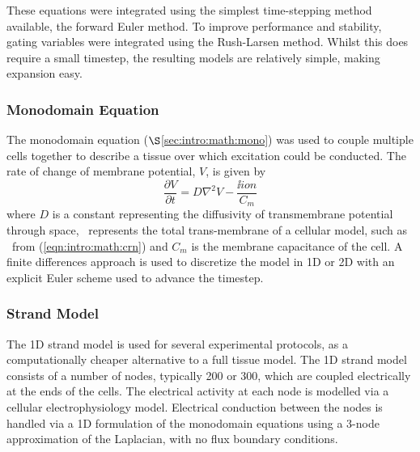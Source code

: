 These equations were integrated using the simplest time-stepping method
available, the forward Euler method.
To improve performance and stability, gating variables were integrated using the
Rush-Larsen method.
Whilst this does require a small timestep, the resulting models are relatively
simple, making expansion easy.


\subsubsection{Monodomain Equation}

The monodomain equation ($\S$\ref{sec:intro:math:mono}) was used to couple multiple cells together to describe
a tissue over which excitation could be conducted.
The rate of change of membrane potential, $V$, is given by
\begin{equation}
\label{eqn:toolkit:monodomain}
\frac{\partial V}{\partial t} = D \nabla^{2} V - \frac{\ii{ion}}{C_{m}}
\end{equation}
where $D$ is a constant representing the diffusivity of transmembrane potential through
space, \ represents the total trans-membrane of a cellular model, such
as \ from (\ref{eqn:intro:math:crn}) and $C_{m}$ is the membrane capacitance
of the cell.
A finite differences approach is used to discretize the model in 1D or 2D with
an explicit Euler scheme used to advance the timestep.

\subsubsection{Strand Model}

% 

The 1D strand model is used for several experimental protocols, as
a computationally cheaper alternative to a full tissue model.
The 1D strand model consists of a number of nodes, typically 200 or 300, which
are coupled electrically at the ends of the cells.
The electrical activity at each node is modelled via a cellular
electrophysiology model.
Electrical conduction between the nodes is handled via a 1D formulation of the
monodomain equations using a 3-node approximation of the Laplacian, with no
flux boundary conditions.



